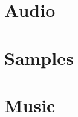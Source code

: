 %
% 
% 
\def\FileCreated{Sat Jun 23 02:26:44 2001}
\def\FileRevised{Sat Jun 23 02:27:26 2001}

\section{Audio}
\section{Samples}
\section{Music}
